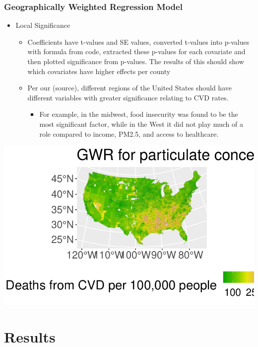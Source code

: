 \documentclass[
]{article}
\providecommand{\tightlist}{%
  \setlength{\itemsep}{0pt}\setlength{\parskip}{0pt}}\usepackage{longtable,booktabs,array}
\begin{document}
\subsubsection{Geographically Weighted Regression
Model}\label{geographically-weighted-regression-model}

\begin{itemize}
\item
  Local Significance

  \begin{itemize}
  \item
    Coefficients have t-values and SE values, converted t-values into
    p-values with formula from code, extracted these p-values for each
    covariate and then plotted significance from p-values. The results
    of this should show which covariates have higher effects per county
  \item
    Per our (source), different regions of the United States should have
    different variables with greater significance relating to CVD rates.

    \begin{itemize}
    \tightlist
    \item
      For example, in the midwest, food insecurity was found to be the
      most significant factor, while in the West it did not play much of
      a role compared to income, PM2.5, and access to healthcare.
    \end{itemize}
  \end{itemize}
\end{itemize}

\includegraphics{report_files/figure-pdf/unnamed-chunk-2-1.pdf}

\section{Results}\label{results}
\end{document}
